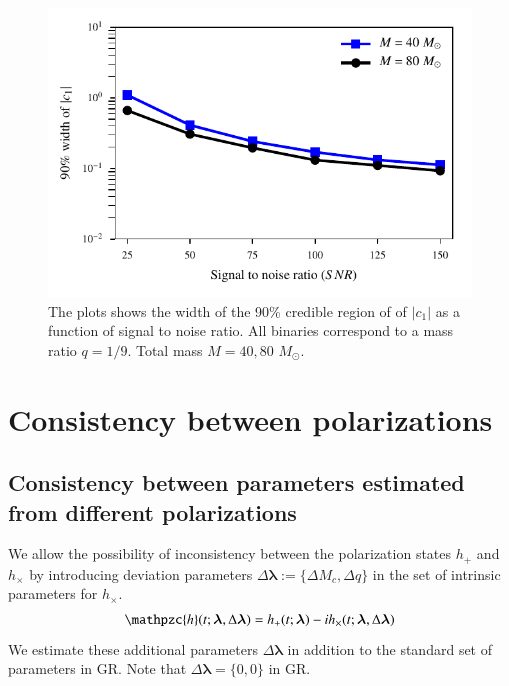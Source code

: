 \documentclass[prd,preprintnumbers,twocolumn,eqsecnum,floatfix,a4paper,nofootinbib,superscriptaddress]{revtex4}
\newcommand{\h}{\mathpzc{h}}
\newcommand{\blambda}{\bm{\lambda}}
\begin{document}
\newpage
\begin{figure}[h]
    \begin{center}
    \includegraphics[scale=0.75]{figs/confidence_interval_c1_varying_snr.pdf} 
    \end{center} 
    \caption{The plots shows the width of the 90\% credible region of of $|c_1|$ as a function of signal to noise ratio. All binaries correspond to a mass ratio $q = 1/9$. Total mass $M={40,80}$ $M_{\odot}$.}
    \label{fig:c1_bound_c}
\end{figure}

\newpage
\section{Consistency between polarizations}
\subsection{Consistency between parameters estimated from different polarizations}

We allow the possibility of inconsistency between the polarization states $h_+$ and $h_\times$ by introducing deviation parameters  $\Delta \blambda := \{\Delta M_c, \Delta q\}$ in the set of intrinsic parameters for $h_\times$.
\begin{eqnarray} 
\h(t; \blambda, \Delta \blambda) =  h_+(t; \blambda) - ih_\times(t; \blambda, \Delta \blambda)
\label{eq:test_hp_hc}
\end{eqnarray}
We estimate these additional parameters $\Delta \blambda$ in addition to the standard set of parameters in GR. Note that $\Delta \blambda = \{0,0\}$ in GR.
\end{document}
